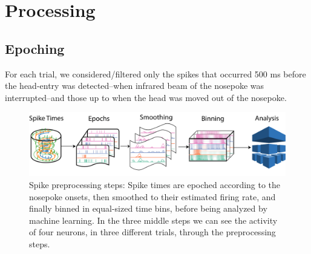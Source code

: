 \section{Processing}
\label{chap:processing}

\subsection{Epoching}
    For each trial, we considered/filtered only the spikes that occurred 500 ms before the head-entry was detected--when infrared beam of the nosepoke was interrupted--and those up to when the head was moved out of the nosepoke. 
    
    \begin{figure}
        \centering
        \includegraphics[width=\textwidth]{figures/Pipeline.png}
        \caption[Spike preprocessing steps]{Spike preprocessing steps: Spike times are epoched according to the nosepoke onsets, then smoothed to their estimated firing rate, and finally binned in equal-sized time bins, before being analyzed by machine learning. In the three middle steps we can see the activity of four neurons, in three different trials, through the preprocessing steps.}
        \label{fig:preproc}
    \end{figure} 
    

